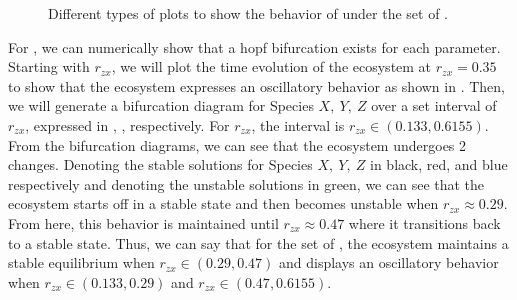 \begin{figure}[H]
    \centering
    \hspace{5pt}
    \hspace{5pt}
    \hspace{5pt}
    \hspace{5pt}
    \caption{Different types of plots to show the behavior of  under the set of .}
    \label{fig:nontrivial-equilibria-plots}
\end{figure}

For , we can numerically show that a hopf bifurcation exists for each parameter.
Starting with $r_{zx}$, we will plot the time evolution of the ecosystem at $r_{zx}=0.35$ to show that the ecosystem expresses an oscillatory behavior as shown in .
Then, we will generate a bifurcation diagram for Species $X,\ Y,\ Z$ over a set interval of $r_{zx}$, expressed in , ,  respectively.
For $r_{zx}$, the interval is $r_{zx}\in(0.133,0.6155)$.
From the bifurcation diagrams, we can see that the ecosystem undergoes 2 changes.
Denoting the stable solutions for Species $X,\ Y,\ Z$ in black, red, and blue respectively and denoting the unstable solutions in green, we can see that the ecosystem starts off in a stable state and then becomes unstable when $r_{zx}\approx 0.29$.
From here, this behavior is maintained until $r_{zx}\approx 0.47$ where it transitions back to a stable state.
Thus, we can say that for the set of , the ecosystem maintains a stable equilibrium when $r_{zx}\in(0.29,0.47)$ and displays an oscillatory behavior when $r_{zx}\in(0.133,0.29)$ and $r_{zx}\in(0.47,0.6155)$.


